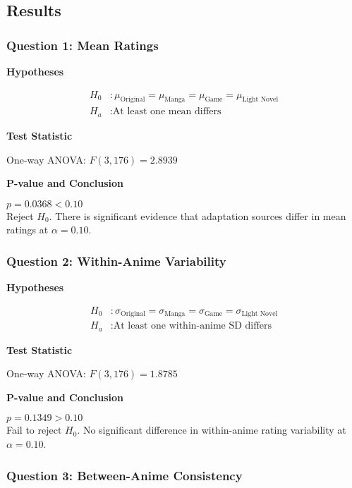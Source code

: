 \documentclass{article}
\begin{document}
\begin{CJK*}{UTF8}{gbsn}
\subsection{Results}

\subsubsection{Question 1: Mean Ratings}

\textbf{Hypotheses}

\begin{align*}
H_0&: \mu_{\text{Original}} = \mu_{\text{Manga}} = \mu_{\text{Game}} = \mu_{\text{Light Novel}} \\
H_a&: \text{At least one mean differs}
\end{align*}

\textbf{Test Statistic}

One-way ANOVA: $F(3, 176) = 2.8939$

\textbf{P-value and Conclusion}

$p = 0.0368 < 0.10$ \\
Reject $H_0$. There is significant evidence that adaptation sources differ in mean ratings at $\alpha = 0.10$.

\subsubsection{Question 2: Within-Anime Variability}

\textbf{Hypotheses}

\begin{align*}
H_0&: \sigma_{\text{Original}} = \sigma_{\text{Manga}} = \sigma_{\text{Game}} = \sigma_{\text{Light Novel}} \\
H_a&: \text{At least one within-anime SD differs}
\end{align*}

\textbf{Test Statistic}

One-way ANOVA: $F(3, 176) = 1.8785$

\textbf{P-value and Conclusion}

$p = 0.1349 > 0.10$ \\
Fail to reject $H_0$. No significant difference in within-anime rating variability at $\alpha = 0.10$.

\subsubsection{Question 3: Between-Anime Consistency}


\end{CJK*}
\end{document}
